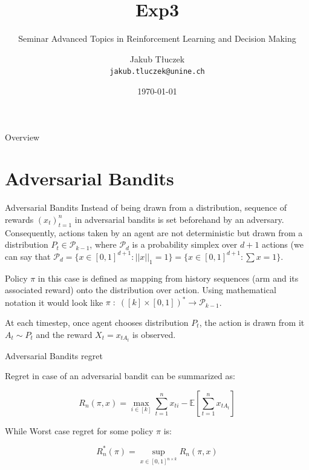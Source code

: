 \documentclass[aspectratio=169,xcolor=dvipsnames]{beamer}
\title[short title]{Exp3}
\subtitle{Seminar Advanced Topics in Reinforcement Learning and Decision Making }
\author[Kuba] {Jakub Tłuczek \\ \texttt{jakub.tluczek@unine.ch}}
\institute[UniNE] %
{
    Universite de Neuchâtel\\
    Swiss Joint Master in Computer Science
    \vskip 3pt
}
\date{\today} %
\begin{document}
\begin{frame}
    \titlepage
\end{frame}

\begin{frame}{Overview}
    \tableofcontents
\end{frame}

\section{Adversarial Bandits}
\begin{frame}{Adversarial Bandits}
    Instead of being drawn from a distribution, sequence of rewards $(x_t)_{t=1}^n$ in adversarial bandits is set beforehand by an adversary. Consequently, actions taken by an agent are not deterministic but drawn from a distribution $P_t \in \mathcal{P}_{k-1}$, where $\mathcal{P}_d$ is a probability simplex over $d+1$ actions (we can say that $\mathcal{P}_d = \{ x \in [0,1]^{d+1} : ||x||_1 = 1 \} = \{ x \in [0,1]^{d+1} : \sum x = 1 \}$. 
    
    Policy $\pi$ in this case is defined as mapping from history sequences (arm and its associated reward) onto the distribution over action. Using mathematical notation it would look like $\pi\; : \; ([k] \times [0,1])^{*} \rightarrow \mathcal{P}_{k-1}$.
    
    At each timestep, once agent chooses distribution $P_t$, the action is drawn from it $A_t \sim P_t$ and the reward $X_t = x_{t A_t}$ is observed. 
\end{frame}

\begin{frame}{Adversarial Bandits regret}

    Regret in case of an adversarial bandit can be summarized as:

    \begin{equation}
        R_n(\pi, x) = \max_{i \in [k]} \sum_{t=1}^n x_{ti} - \mathbb{E}\left[ \sum_{t=1}^n x_{t A_t}\right]
    \end{equation}

    While Worst case regret for some policy $\pi$ is:

    \begin{equation}
        R^{*}_n(\pi) = \sup_{x \in [0,1]^{n \times k}} R_n(\pi, x)
    \end{equation}
\end{frame}
\end{document}
